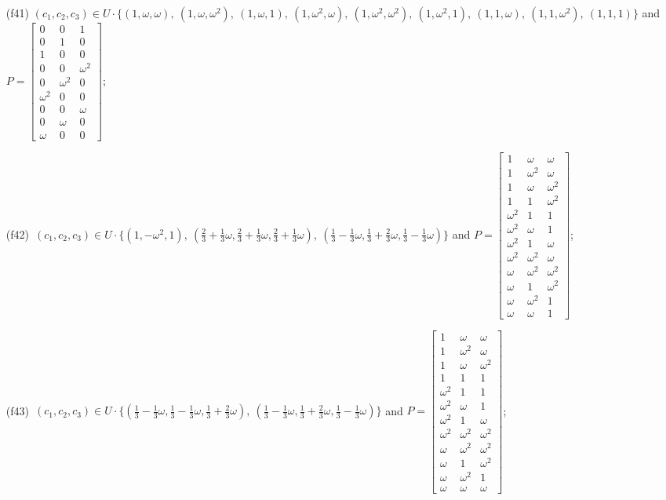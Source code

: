 \begin{enumerate}
\item[(f41)] $(c_1,c_2,c_3)\in U\cdot\{(1,\omega,\omega),\allowbreak\ (1,\omega,\omega^2),\allowbreak\ (1,\omega,1),\allowbreak\ (1,\omega^2,\omega),\allowbreak\ (1,\omega^2,\omega^2),\allowbreak\ (1,\omega^2,1),\allowbreak\ (1,1,\omega),\allowbreak\ (1,1,\omega^2),\allowbreak\ (1,1,1)\}$ and $P=\begin{bmatrix}0&0&1\\0&1&0\\1&0&0\\0&0&\omega^2\\0&\omega^2&0\\\omega^2&0&0\\0&0&\omega\\0&\omega&0\\\omega&0&0\end{bmatrix}$;
\item[(f42)\,\newitem] $(c_1,c_2,c_3)\in U\cdot\{(1,-\omega^2,1),\allowbreak\ (\tfrac{2}{3}+\tfrac{1}{3}\omega,\tfrac{2}{3}+\tfrac{1}{3}\omega,\tfrac{2}{3}+\tfrac{1}{3}\omega),\allowbreak\ (\tfrac{1}{3}-\tfrac{1}{3}\omega,\tfrac{1}{3}+\tfrac{2}{3}\omega,\tfrac{1}{3}-\tfrac{1}{3}\omega)\}$ and $P=\begin{bmatrix}1&\omega&\omega\\1&\omega^2&\omega\\1&\omega&\omega^2\\1&1&\omega^2\\\omega^2&1&1\\\omega^2&\omega&1\\\omega^2&1&\omega\\\omega^2&\omega^2&\omega\\\omega&\omega^2&\omega^2\\\omega&1&\omega^2\\\omega&\omega^2&1\\\omega&\omega&1\end{bmatrix}$;
\item[(f43)\,\newitem] $(c_1,c_2,c_3)\in U\cdot\{(\tfrac{1}{3}-\tfrac{1}{3}\omega,\tfrac{1}{3}-\tfrac{1}{3}\omega,\tfrac{1}{3}+\tfrac{2}{3}\omega),\allowbreak\ (\tfrac{1}{3}-\tfrac{1}{3}\omega,\tfrac{1}{3}+\tfrac{2}{3}\omega,\tfrac{1}{3}-\tfrac{1}{3}\omega)\}$ and $P=\begin{bmatrix}1&\omega&\omega\\1&\omega^2&\omega\\1&\omega&\omega^2\\1&1&1\\\omega^2&1&1\\\omega^2&\omega&1\\\omega^2&1&\omega\\\omega^2&\omega^2&\omega^2\\\omega&\omega^2&\omega^2\\\omega&1&\omega^2\\\omega&\omega^2&1\\\omega&\omega&\omega\end{bmatrix}$;

\end{enumerate}
